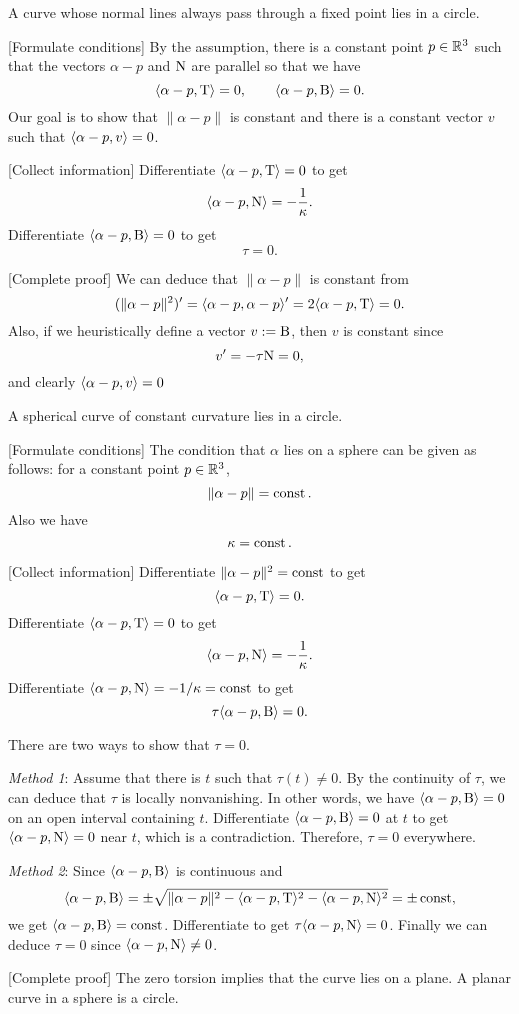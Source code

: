 \documentclass{../exp}
\def\a{\alpha}
\begin{document}
\begin{prb}
A curve whose normal lines always pass through a fixed point lies in a circle.
\end{prb}
\begin{sol}
[Formulate conditions]
By the assumption, there is a constant point $p\in\mathbb{R}^3$ such that the vectors $\a-p$ and $\mathrm{N}$ are parallel so that we have
\[\<\a-p,\rT\>=0,\qquad\<\a-p,\rB\>=0.\]
Our goal is to show that $\|\a-p\|$ is constant and there is a constant vector $v$ such that $\<\a-p,v\>=0$.

[Collect information]
Differentiate $\<\a-p,\rT\>=0$ to get
\[\<\a-p,\rN\>=-\frac1\kappa.\]
Differentiate $\<\a-p,\rB\>=0$ to get
\[\tau=0.\]

[Complete proof]
We can deduce that $\|\a-p\|$ is constant from
\[(\|\a-p\|^2)'=\<\a-p,\a-p\>'=2\<\a-p,\rT\>=0.\]
Also, if we heuristically define a vector $v:=\mathrm{B}$, then $v$ is constant since
\[v'=-\tau\mathrm{N}=0,\]
and clearly $\<\a-p,v\>=0$
\end{sol}

\begin{prb}
A spherical curve of constant curvature lies in a circle.
\end{prb}
\begin{sol}
[Formulate conditions]
The condition that $\a$ lies on a sphere can be given as follows: for a constant point $p\in\mathbb{R}^3$,
\[\|\a-p\|=\const.\]
Also we have
\[\kappa=\operatorname{const}.\]

[Collect information]
Differentiate $\|\a-p\|^2=\const$ to get
\[\<\a-p,\rT\>=0.\]
Differentiate $\<\a-p,\rT\>=0$ to get
\[\<\a-p,\rN\>=-\frac1\kappa.\]
Differentiate $\<\a-p,\rN\>=-1/\kappa=\const$ to get
\[\tau\<\a-p,\rB\>=0.\]

There are two ways to show that $\tau=0$.

\emph{Method 1}:
Assume that there is $t$ such that $\tau(t)\ne0$.
By the continuity of $\tau$, we can deduce that $\tau$ is locally nonvanishing.
In other words, we have $\<\a-p,\rB\>=0$ on an open interval containing $t$.
Differentiate $\<\a-p,\rB\>=0$ at $t$ to get $\<\a-p,\rN\>=0$ near $t$, which is a contradiction.
Therefore, $\tau=0$ everywhere.

\emph{Method 2}:
Since $\<\a-p,\rB\>$ is continuous and
\[\<\a-p,\rB\>=\pm\sqrt{\|\a-p\|^2-\<\a-p,\rT\>^2-\<\a-p,\rN\>^2}=\pm\const,\]
we get $\<\a-p,\rB\>=\const$.
Differentiate to get $\tau\<\a-p,\rN\>=0$.
Finally we can deduce $\tau=0$ since $\<\a-p,\rN\>\ne0$.

[Complete proof]
The zero torsion implies that the curve lies on a plane.
A planar curve in a sphere is a circle.
\end{sol}
\end{document}
